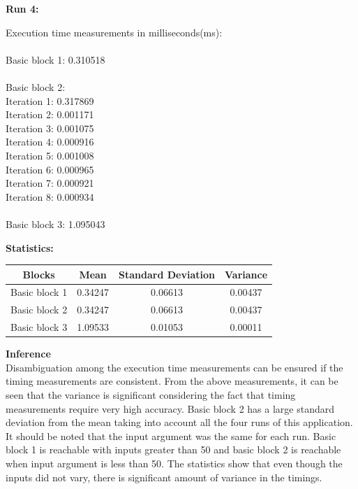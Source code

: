 \documentclass[11pt]{article}
\begin{document}
\textbf{Run 4:}

Execution time measurements in milliseconds(ms):\\
\\Basic block 1: 0.310518\\
\\Basic block 2:\\
\hspace{2em} Iteration 1: 0.317869\\
\hspace{2em} Iteration 2: 0.001171\\
\hspace{2em} Iteration 3: 0.001075\\
\hspace{2em} Iteration 4: 0.000916\\
\hspace{2em} Iteration 5: 0.001008\\
\hspace{2em} Iteration 6: 0.000965\\
\hspace{2em} Iteration 7: 0.000921\\
\hspace{2em} Iteration 8: 0.000934\\
\\Basic block 3: 1.095043

\textbf{Statistics: }\\

\begin{center}
\begin{tabular}{|c|c|c|c|}
\hline
Blocks&Mean&Standard Deviation&Variance\\
\hline
Basic block 1&0.34247&0.06613&0.00437\\
Basic block 2&0.34247&0.06613&0.00437\\
Basic block 3&1.09533&0.01053&0.00011\\
\hline
\end{tabular}
\end{center}

\textbf{Inference}\newline
\\Disambiguation among the execution time measurements can be ensured if the timing measurements are consistent. From the above measurements, it can be seen that the variance is significant considering the fact that timing measurements require very high accuracy. Basic block 2 has a large standard deviation from the mean taking into account all the four runs of this application. It should be noted that the input argument was the same for each run. Basic block 1 is reachable with inputs greater than 50 and basic block 2 is reachable when input argument is less than 50. The statistics show that even though the inputs did not vary, there is significant amount of variance in the timings.
\end{document}
